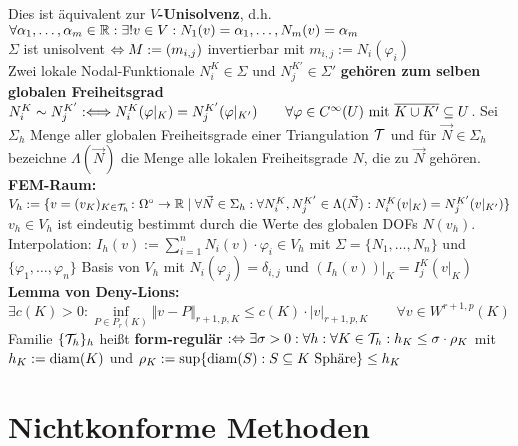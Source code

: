 \documentclass[12pt]{scrartcl}
\begin{document}
	Dies ist äquivalent zur \textbf{$V$-Unisolvenz}, d.h. $\forall\alpha_1,\ldots,\alpha_m\in\R:\exists! v\in V:N_1(v)=\alpha_1,\ldots,N_m(v)=\alpha_m$\\
	$\Sigma$ ist unisolvent $\gdw M:=(m_{i,j})$ invertierbar mit $m_{i,j}:=N_i(\varphi_i)$\\
	Zwei lokale Nodal-Funktionale $N_i^K\in\Sigma$ und $N_j^{K'}\in\Sigma'$ \textbf{gehören zum selben globalen Freiheitsgrad} $N_i^K\sim N_j^{K'}:\Longleftrightarrow N_i^K(\varphi|_K)=N_j^{K'}(\varphi|_{K'})\qquad\forall\varphi\in C^\infty(U)\mit\overline{K\cup K'}\subseteq U$.
	Sei $\Sigma_h$ Menge aller globalen Freiheitsgrade einer Triangulation $\T$ und für $\vec{N}\in\Sigma_h$ bezeichne $\Lambda(\vec{N})$ die Menge alle lokalen Freiheitsgrade $N$, die zu $\vec{N}$ gehören.\\
	\textbf{FEM-Raum:} $V_h:=\lbrace v=(v_{K})_{K\in\T_h}\colon\Omega^\circ\to\R\mid \forall \vec{N}\in\Sigma_h:\forall N_i^{K},N_j^{K'}\in\Lambda(\vec{N}):N_i^{K}(v|_K)=N_j^{K'}(v|_{K'})\rbrace$\\
	$v_h\in V_h$ ist eindeutig bestimmt durch die Werte des globalen DOFs $N(v_h)$.\\
	Interpolation: $I_h(v):=\sum\limits_{i=1}^n N_i(v)\cdot\varphi_i\in V_h$ mit $\Sigma=\lbrace N_1,\ldots,N_n\rbrace$ und $\lbrace\varphi_1,\ldots,\varphi_n\rbrace$ Basis von $V_h$ mit $N_i(\varphi_j)=\delta_{i,j}$ und $(I_h(v))|_K=I_j^K(v|_K)$\\
	\textbf{Lemma von Deny-Lions:} $\exists c(K)>0:\inf\limits_{P\in P_r(K)}\Vert v-P\Vert_{r+1,p,K}\leq c(K)\cdot |v|_{r+1,p,K}\qquad\forall v\in W^{r+1,p}(K)$\\
	Familie $\lbrace\T_h\rbrace_h$ heißt \textbf{form-regulär} $:\gdw\exists\sigma>0:\forall h:\forall K\in\T_h:h_K\leq\sigma\cdot \rho_K$ mit $h_K:=\diam(K)$ und $\rho_K:=\sup\lbrace\diam(S):S\subseteq K\text{ Sphäre}\rbrace\leq h_K$
	
	\section{Nichtkonforme Methoden}
	
\end{document}
